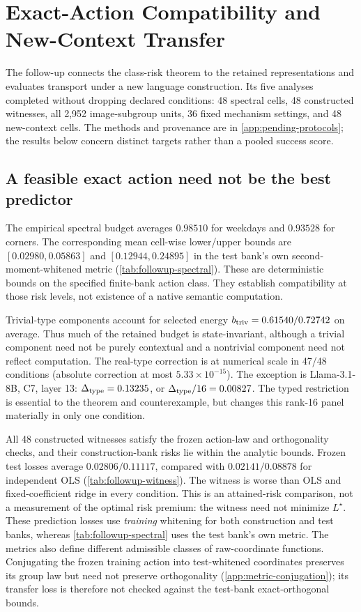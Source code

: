 \section{Exact-Action Compatibility and New-Context Transfer}
\label{sec:pending-studies}
The follow-up connects the class-risk theorem to the retained representations and evaluates transport under a new language construction. Its five analyses completed without dropping declared conditions: 48 spectral cells, 48 constructed witnesses, all 2,952 image-subgroup units, 36 fixed mechanism settings, and 48 new-context cells. The methods and provenance are in \cref{app:pending-protocols}; the results below concern distinct targets rather than a pooled success score.

\subsection{A feasible exact action need not be the best predictor}

The empirical spectral budget averages $0.98510$ for weekdays and $0.93528$ for corners. The corresponding mean cell-wise lower/upper bounds are $[0.02980,0.05863]$ and $[0.12944,0.24895]$ in the test bank's own second-moment-whitened metric (\cref{tab:followup-spectral}). These are deterministic bounds on the specified finite-bank action class. They establish compatibility at those risk levels, not existence of a native semantic computation.

Trivial-type components account for selected energy $b_{\rm triv}=0.61540/0.72742$ on average. Thus much of the retained budget is state-invariant, although a trivial component need not be purely contextual and a nontrivial component need not reflect computation. The real-type correction is at numerical scale in 47/48 conditions (absolute correction at most $5.33\times10^{-15}$). The exception is Llama-3.1-8B, C7, layer 13: $\Delta_{\rm type}=0.13235$, or $\Delta_{\rm type}/16=0.00827$. The typed restriction is essential to the theorem and counterexample, but changes this rank-16 panel materially in only one condition.


All 48 constructed witnesses satisfy the frozen action-law and orthogonality checks, and their construction-bank risks lie within the analytic bounds. Frozen test losses average $0.02806/0.11117$, compared with $0.02141/0.08878$ for independent OLS (\cref{tab:followup-witness}). The witness is worse than OLS and fixed-coefficient ridge in every condition. This is an attained-risk comparison, not a measurement of the optimal risk premium: the witness need not minimize $L^\star$. These prediction losses use \emph{training} whitening for both construction and test banks, whereas \cref{tab:followup-spectral} uses the test bank's own metric. The metrics also define different admissible classes of raw-coordinate functions. Conjugating the frozen training action into test-whitened coordinates preserves its group law but need not preserve orthogonality (\cref{app:metric-conjugation}); its transfer loss is therefore not checked against the test-bank exact-orthogonal bounds.

